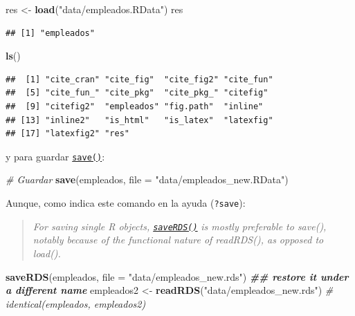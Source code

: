 \documentclass[
]{book}
\newenvironment{Shaded}{\begin{snugshade}}{\end{snugshade}}
\newcommand{\AttributeTok}[1]{\textcolor[rgb]{0.13,0.29,0.53}{#1}}
\newcommand{\CommentTok}[1]{\textcolor[rgb]{0.56,0.35,0.01}{\textit{#1}}}
\newcommand{\DocumentationTok}[1]{\textcolor[rgb]{0.56,0.35,0.01}{\textbf{\textit{#1}}}}
\newcommand{\FunctionTok}[1]{\textcolor[rgb]{0.13,0.29,0.53}{\textbf{#1}}}
\newcommand{\NormalTok}[1]{#1}
\newcommand{\OtherTok}[1]{\textcolor[rgb]{0.56,0.35,0.01}{#1}}
\newcommand{\StringTok}[1]{\textcolor[rgb]{0.31,0.60,0.02}{#1}}
\begin{document}
\begin{Shaded}
\begin{Highlighting}[]
\NormalTok{res }\OtherTok{\textless{}{-}} \FunctionTok{load}\NormalTok{(}\StringTok{"data/empleados.RData"}\NormalTok{)}
\NormalTok{res}
\end{Highlighting}
\end{Shaded}

\begin{verbatim}
## [1] "empleados"
\end{verbatim}

\begin{Shaded}
\begin{Highlighting}[]
\FunctionTok{ls}\NormalTok{()}
\end{Highlighting}
\end{Shaded}

\begin{verbatim}
##  [1] "cite_cran" "cite_fig"  "cite_fig2" "cite_fun" 
##  [5] "cite_fun_" "cite_pkg"  "cite_pkg_" "citefig"  
##  [9] "citefig2"  "empleados" "fig.path"  "inline"   
## [13] "inline2"   "is_html"   "is_latex"  "latexfig" 
## [17] "latexfig2" "res"
\end{verbatim}

y para guardar \href{https://www.rdocumentation.org/packages/base/versions/3.6.1/topics/save}{\texttt{save()}}:

\begin{Shaded}
\begin{Highlighting}[]
\CommentTok{\# Guardar}
\FunctionTok{save}\NormalTok{(empleados, }\AttributeTok{file =} \StringTok{"data/empleados\_new.RData"}\NormalTok{)}
\end{Highlighting}
\end{Shaded}

Aunque, como indica este comando en la ayuda (\texttt{?save}):

\begin{quote}
\emph{For saving single R objects, \href{https://www.rdocumentation.org/packages/base/versions/3.6.1/topics/saveRDS}{\texttt{saveRDS()}}}
\emph{is mostly preferable to save(),}
\emph{notably because of the functional nature of readRDS(), as opposed to load().}
\end{quote}

\begin{Shaded}
\begin{Highlighting}[]
\FunctionTok{saveRDS}\NormalTok{(empleados, }\AttributeTok{file =} \StringTok{"data/empleados\_new.rds"}\NormalTok{)}
\DocumentationTok{\#\# restore it under a different name}
\NormalTok{empleados2 }\OtherTok{\textless{}{-}} \FunctionTok{readRDS}\NormalTok{(}\StringTok{"data/empleados\_new.rds"}\NormalTok{)}
\CommentTok{\# identical(empleados, empleados2)}
\end{Highlighting}
\end{Shaded}
\end{document}

